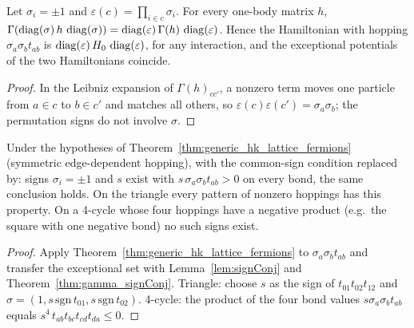 \begin{theorem}
  \label{thm:gamma_signConj}
  \leanok
  Let $\sigma_i=\pm1$ and $\varepsilon(c)=\prod_{i\in c}\sigma_i$. For every one-body matrix $h$,
  $\Gamma(\operatorname{diag}(\sigma)\,h\,\operatorname{diag}(\sigma))=\operatorname{diag}(\varepsilon)\,\Gamma(h)\,\operatorname{diag}(\varepsilon)$. Hence the Hamiltonian
  with hopping $\sigma_a\sigma_bt_{ab}$ is $\operatorname{diag}(\varepsilon)\,H_0\,\operatorname{diag}(\varepsilon)$, for any interaction, and
  the exceptional potentials of the two Hamiltonians coincide.
\end{theorem}
\begin{proof}
  \leanok
  In the Leibniz expansion of $\Gamma(h)_{cc'}$, a nonzero term moves one particle from $a\in c$ to $b\in c'$ and
  matches all others, so $\varepsilon(c)\varepsilon(c')=\sigma_a\sigma_b$; the permutation signs do not involve
  $\sigma$.
\end{proof}

\begin{theorem}
  \label{thm:generic_hk_gauge}
  \leanok
  Under the hypotheses of Theorem~\ref{thm:generic_hk_lattice_fermions} (symmetric edge-dependent hopping), with
  the common-sign condition replaced by: signs $\sigma_i=\pm1$ and $s$ exist with $s\,\sigma_a\sigma_bt_{ab}>0$ on
  every bond, the same conclusion holds. On the triangle every pattern of
  nonzero hoppings has this property. On a 4-cycle whose four hoppings have a negative product (e.g.\ the square
  with one negative bond) no such signs exist.
\end{theorem}
\begin{proof}
  \leanok
  Apply Theorem~\ref{thm:generic_hk_lattice_fermions} to $\sigma_a\sigma_bt_{ab}$ and transfer the exceptional set
  with Lemma~\ref{lem:signConj} and Theorem~\ref{thm:gamma_signConj}. Triangle: choose $s$ as the sign of
  $t_{01}t_{02}t_{12}$ and $\sigma=(1,s\,\mathrm{sgn}\,t_{01},s\,\mathrm{sgn}\,t_{02})$. 4-cycle: the product of the
  four bond values $s\sigma_a\sigma_bt_{ab}$ equals $s^4\,t_{ab}t_{bc}t_{cd}t_{da}\le0$.
\end{proof}


